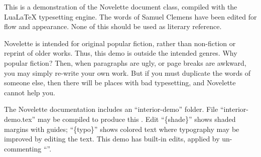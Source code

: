\documentclass[../interior-demo.tex]{subfiles}
\begin{document}
\begin{fullpage} %
\begin{upperpage}
\null\null\null\null %
\null\null %
\end{upperpage}
\begin{blockindent}[2,2]
This is a demonstration of the Novelette document
class, compiled with the LuaLaTeX typesetting engine.
The words of Samuel Clemens have been edited for flow and appearance.
None of this should be used as literary reference.\par
\forceindent Novelette is intended for original popular fiction, rather than
non-fiction or reprint of older works. Thus, this demo is outside the intended
genres. Why  popular fiction? Then, when paragraphs are ugly,
or page breaks are awkward, you may simply re-write your own work.
But if you must duplicate the words of someone else, then there will be places
with bad typesetting, and Novelette cannot help you.\par 
\forceindent The Novelette documentation includes an ``interior-demo'' folder.
File ``interior-demo.tex'' may be compiled to produce this .
Edit ``\string\mode\{shade\}'' shows shaded margins with guides;
``\string\mode\{typo\}'' shows colored text where typography may be
improved by editing the text. This demo has built-in edits,
applied by un-commenting ``\string\editstrue''.\par
\end{blockindent}
\end{fullpage}


\blankpage %
\end{document}

